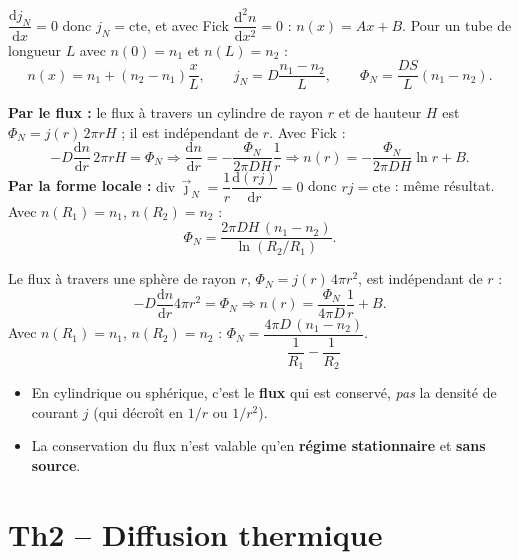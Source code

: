 \documentclass[11pt,a4paper]{article}
\newcommand{\jn}{\vec{\jmath}_N}
\renewcommand{\div}{\mathrm{div}\,}
\newcommand{\dd}{\mathrm{d}}
\newcommand{\ur}{\vec{u}_r}
\begin{document}
\begin{demo}[title={Application en géométrie cartésienne 1D}]
$\dfrac{\dd j_N}{\dd x}=0$ donc $j_N=\text{cte}$, et avec Fick $\dfrac{\dd^2n}{\dd x^2}=0$ :
$n(x)=Ax+B$. Pour un tube de longueur $L$ avec $n(0)=n_1$ et $n(L)=n_2$ :
\[ n(x)=n_1+(n_2-n_1)\dfrac{x}{L},\qquad j_N=D\dfrac{n_1-n_2}{L},\qquad
   \Phi_N=\dfrac{DS}{L}(n_1-n_2). \]
\end{demo}

\begin{demo}[title={Application en géométrie cylindrique ($n=n(r)$, $\jn=j(r)\ur$)}]
\textbf{Par le flux :} le flux à travers un cylindre de rayon $r$ et de hauteur $H$ est
$\Phi_N=j(r)\,2\pi rH$ ; il est indépendant de $r$. Avec Fick :
\[ -D\dfrac{\dd n}{\dd r}\,2\pi rH=\Phi_N
   \Longrightarrow \dfrac{\dd n}{\dd r}=-\dfrac{\Phi_N}{2\pi DH}\dfrac1r
   \Longrightarrow n(r)=-\dfrac{\Phi_N}{2\pi DH}\ln r+B. \]
\textbf{Par la forme locale :} $\div\jn=\dfrac1r\dfrac{\dd(rj)}{\dd r}=0$ donc
$rj=\text{cte}$ : même résultat. Avec $n(R_1)=n_1$, $n(R_2)=n_2$ :
\[ \Phi_N=\dfrac{2\pi DH\,(n_1-n_2)}{\ln(R_2/R_1)}. \]
\end{demo}

\begin{demo}[title={Application en géométrie sphérique ($n=n(r)$, $\jn=j(r)\ur$)}]
Le flux à travers une sphère de rayon $r$, $\Phi_N=j(r)\,4\pi r^2$, est indépendant de $r$ :
\[ -D\dfrac{\dd n}{\dd r}4\pi r^2=\Phi_N
   \Longrightarrow n(r)=\dfrac{\Phi_N}{4\pi D}\dfrac1r+B. \]
Avec $n(R_1)=n_1$, $n(R_2)=n_2$ :
$\Phi_N=\dfrac{4\pi D\,(n_1-n_2)}{\dfrac1{R_1}-\dfrac1{R_2}}$.
\end{demo}

\begin{attention}
\begin{itemize}[leftmargin=1.5em]
  \item En cylindrique ou sphérique, c'est le \textbf{flux} qui est conservé, \emph{pas} la
        densité de courant $j$ (qui décroît en $1/r$ ou $1/r^2$).
  \item La conservation du flux n'est valable qu'en \textbf{régime stationnaire} et
        \textbf{sans source}.
\end{itemize}
\end{attention}

\section{Th2 -- Diffusion thermique}
\end{document}
